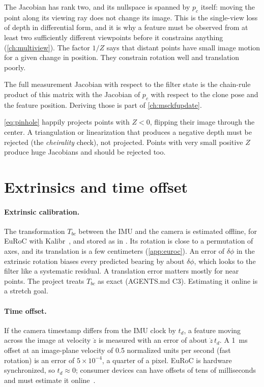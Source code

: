 The Jacobian has rank two, and its nullspace is spanned by $p_c$ itself: moving the point along its viewing ray does not change its image. This is the single-view
loss of depth in differential form, and it is why a feature must be observed from at least two sufficiently different viewpoints before it constrains anything
(\cref{ch:multiview}). The factor $1/Z$ says that distant points have small image motion for a given change in position. They constrain rotation well and
translation poorly.

The full measurement Jacobian with respect to the filter state is the chain-rule product of this matrix with the Jacobian of $p_c$ with respect to the clone pose
and the feature position. Deriving those is part of \cref{ch:msckfupdate}.

\begin{pitfall}
\eqref{eq:pinhole} happily projects points with $Z < 0$, flipping their image through the center. A triangulation or linearization that produces a negative depth must
be rejected (the \emph{cheirality} check), not projected. Points with very small positive $Z$ produce huge Jacobians and should be rejected too.
\end{pitfall}

\section{Extrinsics and time offset}

\paragraph{Extrinsic calibration.} The transformation $T_{bc}$ between the IMU and the camera is estimated offline, for EuRoC with Kalibr~\cite{furgale2013kalibr}, and
stored as  in . Its rotation is close to a permutation of axes, and its translation is a few centimeters (\cref{app:euroc}). An error of
$\delta\phi$ in the extrinsic rotation biases every predicted bearing by about $\delta\phi$, which looks to the filter like a systematic residual. A translation error matters
mostly for near points. The project treats $T_{bc}$ as exact (AGENTS.md C3). Estimating it online is a stretch goal.

\paragraph{Time offset.} If the camera timestamp differs from the IMU clock by $t_d$, a feature moving across the image at velocity $\dot z$ is measured with an error of
about $\dot z\,t_d$. A 1~ms offset at an image-plane velocity of 0.5 normalized units per second (fast rotation) is an error of $5\times10^{-4}$, a quarter of a pixel.
EuRoC is hardware synchronized, so $t_d \approx 0$; consumer devices can have offsets of tens of milliseconds and must estimate it online~\cite{li2014timeoffset}.

